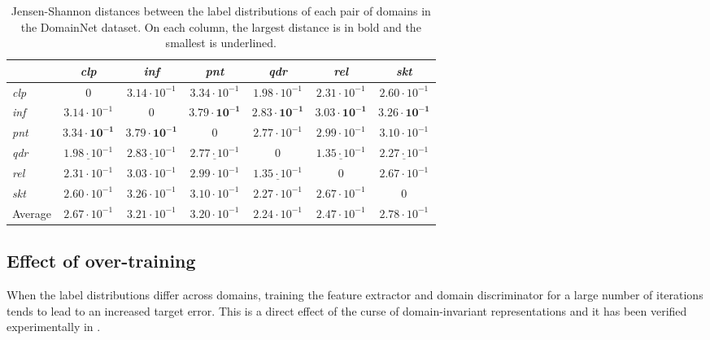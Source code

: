 \begin{table}
	\centering
	\caption{Jensen-Shannon distances between the label distributions of each pair of domains in the DomainNet dataset. On each column, the largest distance is in bold and the smallest is underlined.}
	\small
	\hspace*{-0.50in}
	\begin{tabular}{l|cccccc}
		& \textit{clp}                & \textit{inf}              & \textit{pnt} & \textit{qdr} & \textit{rel} & \textit{skt} \\ \hline
		\textit{clp} & $0$ & $3.14 \cdot 10^{-1}$ & $3.34 \cdot 10^{-1}$     & $1.98 \cdot 10^{-1}$ & $2.31 \cdot 10^{-1}$ & $2.60 \cdot 10^{-1}$         \\
		\textit{inf} & $3.14 \cdot 10^{-1}$ & $0$ & $\boldsymbol{3.79 \cdot 10^{-1}}$ & $\boldsymbol{2.83 \cdot 10^{-1}}$ & $\boldsymbol{3.03 \cdot 10^{-1}}$ & $\boldsymbol{3.26 \cdot 10^{-1}}$ \\
		\textit{pnt} & $\boldsymbol{3.34 \cdot 10^{-1}}$ & $\boldsymbol{3.79 \cdot 10^{-1}}$ & $0$ & $2.77 \cdot 10^{-1}$ & $2.99 \cdot 10^{-1}$ & $3.10 \cdot 10^{-1}$ \\
		\textit{qdr} & $\underline{1.98 \cdot 10^{-1}}$ & $\underline{2.83 \cdot 10^{-1}}$ & $\underline{2.77 \cdot 10^{-1}}$ & $0$ & $\underline{1.35 \cdot 10^{-1}}$ & $\underline{2.27 \cdot 10^{-1}}$ \\
		\textit{rel}  & $2.31 \cdot 10^{-1}$ & $3.03 \cdot 10^{-1}$ & $2.99 \cdot 10^{-1}$ & $\underline{1.35 \cdot 10^{-1}}$ & $0$ & $2.67 \cdot 10^{-1}$ \\
		\textit{skt}  & $2.60 \cdot 10^{-1}$ & $3.26 \cdot 10^{-1}$ & $3.10 \cdot 10^{-1}$ & $2.27 \cdot 10^{-1}$ & $2.67 \cdot 10^{-1}$ & $0$ \\ \hline
		Average & $2.67 \cdot 10^{-1}$ & $3.21 \cdot 10^{-1}$ & $3.20 \cdot 10^{-1}$ & $2.24 \cdot 10^{-1}$ & $2.47 \cdot 10^{-1}$ & $2.78 \cdot 10^{-1}$ \\
	\end{tabular}
	\label{tab:domainnet_js}
\end{table}

\subsection{Effect of over-training}
\label{sec:overtrain}
When the label distributions differ across domains, training the feature extractor and domain discriminator for a large number of iterations tends to lead to an increased target error. This is a direct effect of the curse of domain-invariant representations and it has been verified experimentally in \cite{Zhao2019}.

